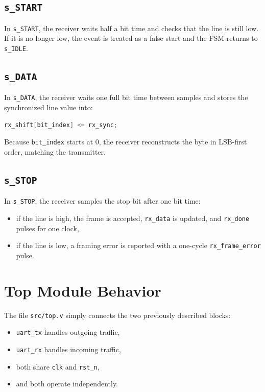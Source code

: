 \documentclass[12pt]{article}
\begin{document}
\subsection*{\texttt{s\_START}}

In \texttt{s\_START}, the receiver waits half a bit time and checks that the line
is still low. If it is no longer low, the event is treated as a false start and
the FSM returns to \texttt{s\_IDLE}.

\subsection*{\texttt{s\_DATA}}

In \texttt{s\_DATA}, the receiver waits one full bit time between samples and
stores the synchronized line value into:

\begin{lstlisting}[language=Verilog]
rx_shift[bit_index] <= rx_sync;
\end{lstlisting}

Because \texttt{bit\_index} starts at 0, the receiver reconstructs the byte in
LSB-first order, matching the transmitter.

\subsection*{\texttt{s\_STOP}}

In \texttt{s\_STOP}, the receiver samples the stop bit after one bit time:

\begin{itemize}
    \item if the line is high, the frame is accepted, \texttt{rx\_data} is updated,
    and \texttt{rx\_done} pulses for one clock,
    \item if the line is low, a framing error is reported with a one-cycle
    \texttt{rx\_frame\_error} pulse.
\end{itemize}

\section{Top Module Behavior}

The file \texttt{src/top.v} simply connects the two previously described blocks:

\begin{itemize}
    \item \texttt{uart\_tx} handles outgoing traffic,
    \item \texttt{uart\_rx} handles incoming traffic,
    \item both share \texttt{clk} and \texttt{rst\_n},
    \item and both operate independently.
\end{itemize}
\end{document}
